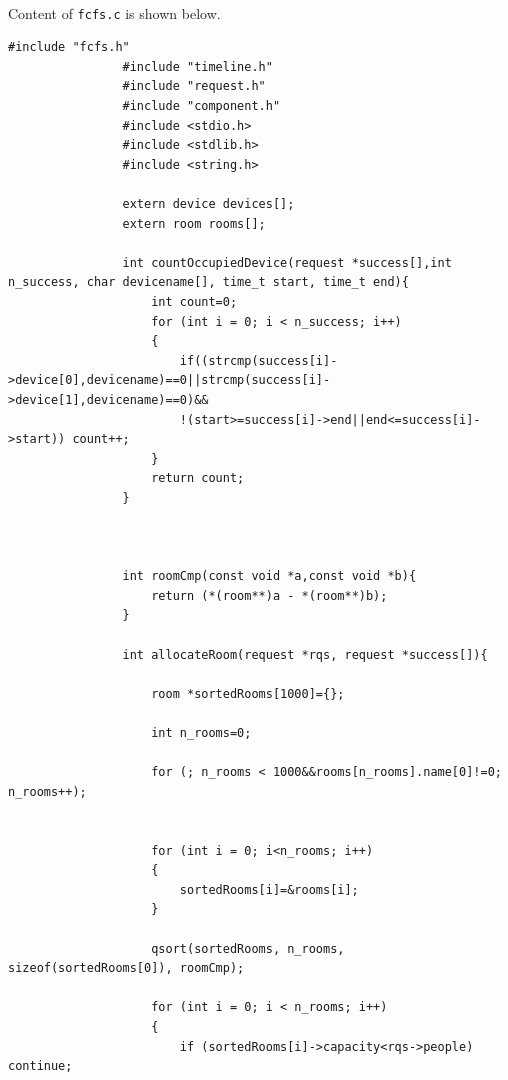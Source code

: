 \documentclass{article}
\begin{document}
            \paragraph{}
                Content of \texttt{fcfs.c} is shown below.
            \begin{Verbatim}[gobble=8]
                #include "fcfs.h"
                #include "timeline.h"
                #include "request.h"
                #include "component.h"
                #include <stdio.h>
                #include <stdlib.h>
                #include <string.h>
                
                extern device devices[];
                extern room rooms[];
                
                int countOccupiedDevice(request *success[],int n_success, char devicename[], time_t start, time_t end){
                    int count=0;
                    for (int i = 0; i < n_success; i++)
                    {
                        if((strcmp(success[i]->device[0],devicename)==0||strcmp(success[i]->device[1],devicename)==0)&&
                        !(start>=success[i]->end||end<=success[i]->start)) count++;
                    }
                    return count;
                }
                
                
                
                int roomCmp(const void *a,const void *b){
                    return (*(room**)a - *(room**)b);
                }
                
                int allocateRoom(request *rqs, request *success[]){
                
                    room *sortedRooms[1000]={};
                
                    int n_rooms=0;
                    
                    for (; n_rooms < 1000&&rooms[n_rooms].name[0]!=0; n_rooms++);
                    
                
                    for (int i = 0; i<n_rooms; i++)
                    {
                        sortedRooms[i]=&rooms[i];
                    }
                
                    qsort(sortedRooms, n_rooms, sizeof(sortedRooms[0]), roomCmp);
                
                    for (int i = 0; i < n_rooms; i++)
                    {
                        if (sortedRooms[i]->capacity<rqs->people) continue;
                

\end{Verbatim}
\end{document}
